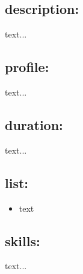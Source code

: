 \documentclass{article}[10pt]
\begin{document}
	\subsection*{description:}
	\begin{adjustwidth}{2cm}{}
		text...
	\end{adjustwidth}
	\subsection*{profile:}
\begin{adjustwidth}{2cm}{}
	text...
\end{adjustwidth}
	\subsection*{duration:}
	text...
	\subsection*{list:}
\begin{adjustwidth}{1cm}{}
	\begin{itemize}
		\item text
	\end{itemize}
\end{adjustwidth}
	\subsection*{skills:}
\begin{adjustwidth}{2cm}{}
	text...
\end{adjustwidth}
\end{document}
